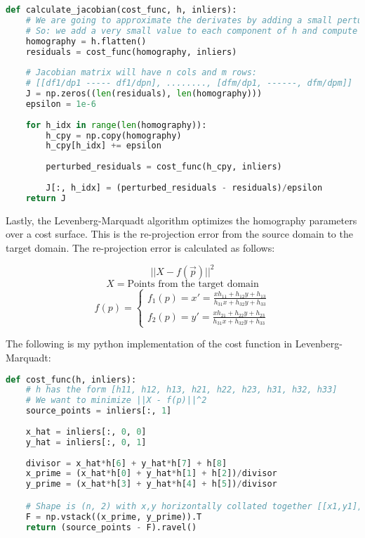 \documentclass{article}
\begin{document}
\begin{lstlisting}[language=Python]
def calculate_jacobian(cost_func, h, inliers):
    # We are going to approximate the derivates by adding a small pertubation to see how that affects the cost function
    # So: we add a very small value to each component of h and compute the change vector and add that into the jacobian matrix.
    homography = h.flatten()
    residuals = cost_func(homography, inliers)
    
    # Jacobian matrix will have n cols and m rows:
    # [[df1/dp1 ----- df1/dpn], ........, [dfm/dp1, ------, dfm/dpm]]
    J = np.zeros((len(residuals), len(homography)))
    epsilon = 1e-6
    
    for h_idx in range(len(homography)):
        h_cpy = np.copy(homography)
        h_cpy[h_idx] += epsilon
    
        perturbed_residuals = cost_func(h_cpy, inliers)
        
        J[:, h_idx] = (perturbed_residuals - residuals)/epsilon
    return J
\end{lstlisting}


Lastly, the Levenberg-Marquadt algorithm optimizes the homography parameters over a cost surface. This is the re-projection error from the source domain to the target domain. The re-projection error is calculated as follows: 

\[||X - f(\Vec{p})||^2\]
\[X = \text{Points from the target domain}\]
\[f(p) = \begin{cases}
    f_1(p) = x' = \frac{x h_{11} + h_{12} y + h_{13}}{h_{31} x + h_{32} y + h_{33}} \\
    f_2(p) = y' = \frac{x h_{21} + h_{22} y + h_{23}}{h_{31} x + h_{32} y + h_{33}}
\end{cases}\]

The following is my python implementation of the cost function in Levenberg-Marquadt:
\begin{lstlisting}[language=Python]
def cost_func(h, inliers):
    # h has the form [h11, h12, h13, h21, h22, h23, h31, h32, h33]
    # We want to minimize ||X - f(p)||^2
    source_points = inliers[:, 1]
    
    x_hat = inliers[:, 0, 0]
    y_hat = inliers[:, 0, 1]
    
    divisor = x_hat*h[6] + y_hat*h[7] + h[8]
    x_prime = (x_hat*h[0] + y_hat*h[1] + h[2])/divisor
    y_prime = (x_hat*h[3] + y_hat*h[4] + h[5])/divisor

    # Shape is (n, 2) with x,y horizontally collated together [[x1,y1], [x2,y2], ...]
    F = np.vstack((x_prime, y_prime)).T
    return (source_points - F).ravel()
\end{lstlisting}
\end{document}
